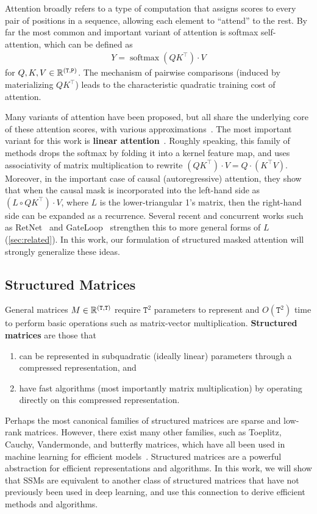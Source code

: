 Attention broadly refers to a type of computation that assigns scores to every pair of positions in a sequence, allowing each element to ``attend'' to the rest.
By far the most common and important variant of attention is softmax self-attention, which can be defined as
\begin{align*}%
  Y = \operatorname*{softmax}(QK^{\top}) \cdot V
\end{align*}
for $Q, K, V \in \mathbb{R}^{\mathtt{(T,P)}}$.
The mechanism of pairwise comparisons (induced by materializing $QK^{\top}$) leads to the characteristic quadratic training cost of attention.

Many variants of attention have been proposed, but all share the underlying core of these attention scores, with various approximations~\citep{tay2022efficient}.
The most important variant for this work is \textbf{linear attention}~\citep{katharopoulos2020transformers}.
Roughly speaking, this family of methods drops the softmax by folding it into a kernel feature map, and uses associativity of matrix multiplication to rewrite
$(QK^{\top}) \cdot V = Q \cdot (K^{\top} V)$.
Moreover, in the important case of causal (autoregressive) attention,
they show that when the causal mask is incorporated into the left-hand side as
$(L \circ QK^{\top}) \cdot V$, where $L$ is the lower-triangular 1's matrix,
then the right-hand side can be expanded as a recurrence.
Several recent and concurrent works
such as RetNet~\citep{sun2023retentive} and GateLoop~\citep{katsch2023gateloop} strengthen this to more general forms of $L$ (\cref{sec:related}).
In this work, our formulation of structured masked attention will strongly generalize these ideas.

\subsection{Structured Matrices}
\label{sec:overview:structured-matrix}

General matrices $M \in \mathbb{R}^{\mathtt{(T,T)}}$ require $\mathtt{T}^2$ parameters to represent and $O(\mathtt{T}^2)$ time to perform basic operations such as matrix-vector multiplication.
\textbf{Structured matrices} are those that
\begin{enumerate}[label=(\roman*)]
  \item can be represented in subquadratic (ideally linear) parameters through a compressed representation, and
  \item have fast algorithms (most importantly matrix multiplication) by operating directly on this compressed representation.
\end{enumerate}
Perhaps the most canonical families of structured matrices are sparse and low-rank matrices.
However, there exist many other families, such as Toeplitz, Cauchy, Vandermonde, and butterfly matrices, which have all been used in machine learning for efficient models~\citep{thomas2018learning,dao2019learning,gu2022parameterization,fu2024monarch}.
Structured matrices are a powerful abstraction for efficient representations and algorithms.
In this work, we will show that SSMs are equivalent to another class of structured matrices that have not previously been used in deep learning, and use this connection to derive efficient methods and algorithms.


